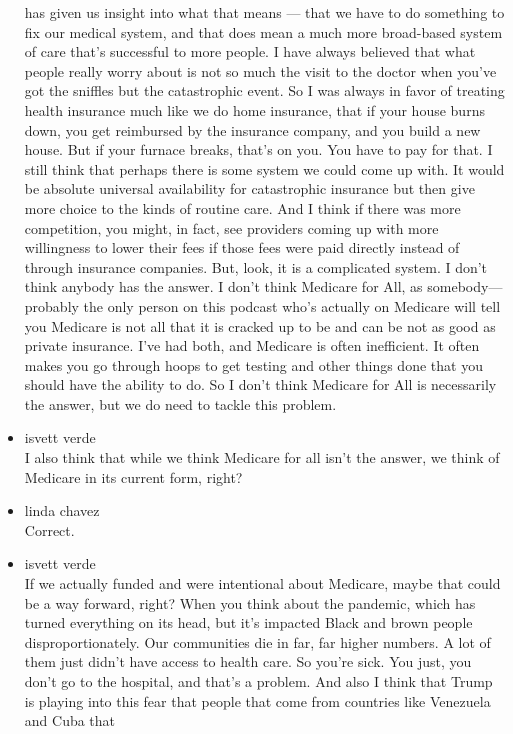 \begin{itemize}
  has given us insight into what that means --- that we have to do
  something to fix our medical system, and that does mean a much more
  broad-based system of care that's successful to more people. I have
  always believed that what people really worry about is not so much the
  visit to the doctor when you've got the sniffles but the catastrophic
  event. So I was always in favor of treating health insurance much like
  we do home insurance, that if your house burns down, you get
  reimbursed by the insurance company, and you build a new house. But if
  your furnace breaks, that's on you. You have to pay for that. I still
  think that perhaps there is some system we could come up with. It
  would be absolute universal availability for catastrophic insurance
  but then give more choice to the kinds of routine care. And I think if
  there was more competition, you might, in fact, see providers coming
  up with more willingness to lower their fees if those fees were paid
  directly instead of through insurance companies. But, look, it is a
  complicated system. I don't think anybody has the answer. I don't
  think Medicare for All, as somebody--- probably the only person on
  this podcast who's actually on Medicare will tell you Medicare is not
  all that it is cracked up to be and can be not as good as private
  insurance. I've had both, and Medicare is often inefficient. It often
  makes you go through hoops to get testing and other things done that
  you should have the ability to do. So I don't think Medicare for All
  is necessarily the answer, but we do need to tackle this problem.
\item
  isvett verde\\
  I also think that while we think Medicare for all isn't the answer, we
  think of Medicare in its current form, right?
\item
  linda chavez\\
  Correct.
\item
  isvett verde\\
  If we actually funded and were intentional about Medicare, maybe that
  could be a way forward, right? When you think about the pandemic,
  which has turned everything on its head, but it's impacted Black and
  brown people disproportionately. Our communities die in far, far
  higher numbers. A lot of them just didn't have access to health care.
  So you're sick. You just, you don't go to the hospital, and that's a
  problem. And also I think that Trump is playing into this fear that
  people that come from countries like Venezuela and Cuba that

\end{itemize}
